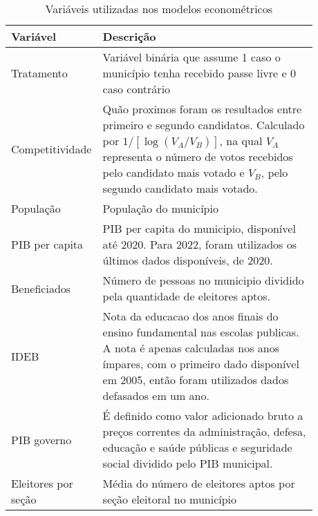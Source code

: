 \begin{table}
    \centering
    \begin{tabular}{m{0.18\linewidth}|m{0.7\linewidth}}
        Variável & Descrição \\
        \toprule
        Tratamento & Variável binária que assume 1 caso o município tenha recebido passe livre e 0 caso contrário \\
        \midrule
        Competitividade & Quão proximos foram os resultados entre primeiro e segundo candidatos. Calculado por $1/[\log({V_A/V_B})]$, na qual $V_A$ representa o número de votos recebidos pelo candidato mais votado e $V_B$, pelo segundo candidato mais votado. \\
        \midrule
        População & População do município \\
        \midrule
        PIB per capita & PIB per capita do municipio, disponível até 2020. Para 2022, foram utilizados os últimos dados disponíveis, de 2020. \\
        \midrule
        Beneficiados & Número de pessoas no municipio dividido pela quantidade de eleitores aptos. \\
        \midrule
        IDEB & Nota da educacao dos anos finais do ensino fundamental nas escolas publicas. A nota é apenas calculadas nos anos ímpares, com o primeiro dado disponível em 2005, então foram utilizados dados defasados em um ano. \\
        \midrule
        PIB governo & É definido como valor adicionado bruto a preços correntes da administração, defesa, educação e saúde públicas e seguridade social dividido pelo PIB municipal. \\
        \midrule
        Eleitores por seção & Média do número de eleitores aptos por seção eleitoral no município

    \end{tabular}

    \caption{Variáveis utilizadas nos modelos econométricos}
    \label{tab_variaveis}
\end{table}

